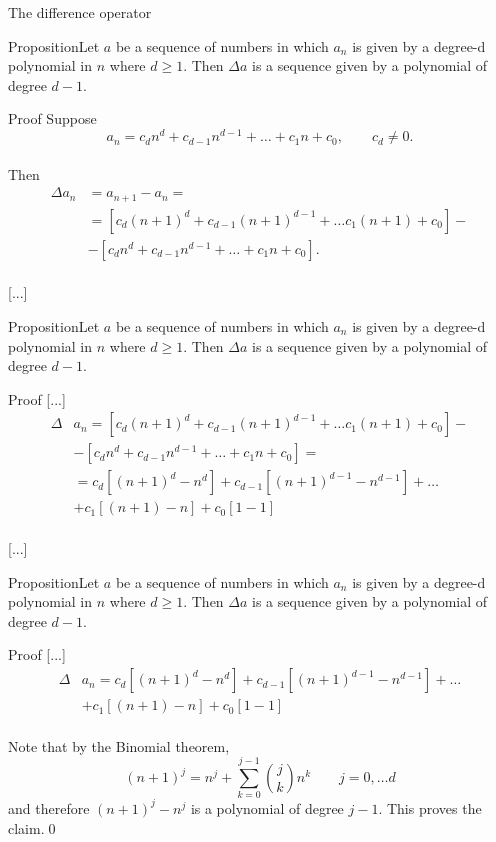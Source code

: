 \documentclass{beamer}
\def\bl[#1]#2{\begin{block}{#1}#2\end{block}}
\begin{document}
\begin{frame}{The difference operator}
\bl[Proposition]{Let $a$ be a sequence of numbers in which $a_n$ is given by a degree-d polynomial in $n$ where $d\geq 1$. Then $\Delta a$ is a sequence given by a polynomial of degree $d-1$.}

\bl[Proof]{
Suppose\vspace{-0.3cm}
\[
a_n=c_dn^d+c_{d-1}n^{d-1}+\dots+c_1 n+c_0,\qquad c_d\neq 0.
\]\vspace{-0.8cm}\\
Then\vspace{-0.3cm}
\begin{align*}
\Delta a_n&=a_{n+1}-a_n=\\
&=\left[c_d(n+1)^d+c_{d-1}(n+1)^{d-1}+\dots c_1(n+1)+c_0\right]-\\
&-\left[c_dn^d+c_{d-1}n^{d-1}+\dots+c_1n+c_0\right].
\end{align*}\\ \vspace{-0.2cm}
[...]
}
\end{frame}

\begin{frame}
\bl[Proposition]{Let $a$ be a sequence of numbers in which $a_n$ is given by a degree-d polynomial in $n$ where $d\geq 1$. Then $\Delta a$ is a sequence given by a polynomial of degree $d-1$.}

\bl[Proof]{
[...]\vspace{-0.2cm}
\begin{align*}
\Delta &a_n=\left[c_d(n+1)^d+c_{d-1}(n+1)^{d-1}+\dots c_1(n+1)+c_0\right]-\\
&-\left[c_dn^d+c_{d-1}n^{d-1}+\dots+c_1n+c_0\right]=\\
&=c_d\left[(n+1)^d-n^d\right]+c_{d-1}\left[(n+1)^{d-1}-n^{d-1}\right]+\dots\\
&+c_1[(n+1)-n]+c_0[1-1]
\end{align*}\\ \vspace{-0.2cm}
[...]
}
\end{frame}

\begin{frame}
\bl[Proposition]{Let $a$ be a sequence of numbers in which $a_n$ is given by a degree-d polynomial in $n$ where $d\geq 1$. Then $\Delta a$ is a sequence given by a polynomial of degree $d-1$.}

\bl[Proof]{
[...]\vspace{-0.3cm}
\begin{align*}
\Delta &a_n=c_d\left[(n+1)^d-n^d\right]+c_{d-1}\left[(n+1)^{d-1}-n^{d-1}\right]+\dots\\
&+c_1[(n+1)-n]+c_0[1-1]
\end{align*}\\ \vspace{-0.2cm}
Note that by the Binomial theorem,\vspace{-0.3cm}
\[
(n+1)^j=n^j+\sum_{k=0}^{j-1}\binom{j}{k}n^k\qquad j=0,\dots d
\]
and therefore $(n+1)^j-n^j$ is a polynomial of degree $j-1$. This proves the claim.\qed
}
\end{frame}
\end{document}

